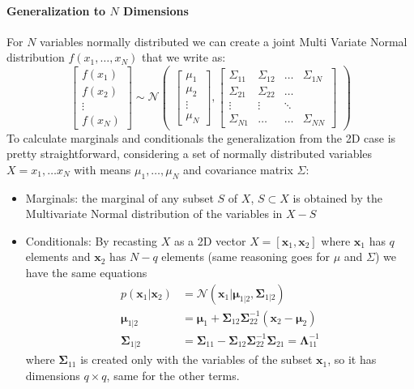 \documentclass{article}
\begin{document}
\paragraph{Generalization to $N$ Dimensions}
For $N$ variables normally distributed we can create a joint Multi Variate Normal distribution $f(x_1, \dots, x_N)$ that we write as:
\begin{equation}
    \begin{bmatrix}
    f(x_1) \\
    f(x_2) \\
    \vdots \\
    f(x_N)
    \end{bmatrix}
    \sim
    \mathcal{N}
    \begin{pmatrix}
    \begin{bmatrix}
    \mu_1 \\
    \mu_2 \\
    \vdots \\
    \mu_N
    \end{bmatrix}
    ,
    \begin{bmatrix}
    \Sigma_{11} & \Sigma_{12} & \dots & \Sigma_{1N} \\
    \Sigma_{21} & \Sigma_{22} & \dots  \\
    \vdots & \vdots{} & \ddots \\
    \Sigma_{N1} & \dots & \dots & \Sigma_{NN}
    \end{bmatrix}
    \end{pmatrix}
\end{equation}
To calculate marginals and conditionals the generalization from the 2D case is pretty straightforward, considering a set of normally distributed variables $X = {x_1, \dots x_N}$ with means $\mu_1, \dots, \mu_N$ and covariance matrix $\Sigma$:
\begin{itemize}
    \item Marginals: the marginal of any subset $S$ of $X$, $S \subset X$ is obtained by the Multivariate Normal distribution of the variables in $X - S$
    \item Conditionals: By recasting $X$ as a 2D vector $X = [\boldsymbol{x}_1, \boldsymbol{x}_2]$ where $\boldsymbol{x}_1$ has $q$ elements and $\boldsymbol{x}_2$ has $N-q$ elements (same reasoning goes for $\mu$ and $\Sigma$) we have the same equations
    \begin{align}
        p(\boldsymbol{x}_1 | \boldsymbol{x}_2) &= \mathcal{N}(\boldsymbol{x}_1 | \boldsymbol{\mu}_{1|2}, \boldsymbol{\Sigma}_{1|2}) \\
        \boldsymbol{\mu}_{1|2} &= \boldsymbol{\mu}_1 + \boldsymbol{\Sigma}_{12} \boldsymbol{\Sigma}_{22}^{-1}(\boldsymbol{x}_2 - \boldsymbol{\mu}_2) \\
        \boldsymbol{\Sigma}_{1|2} &= \boldsymbol{\Sigma}_{11} - \boldsymbol{\Sigma}_{12}\boldsymbol{\Sigma}_{22}^{-1}\boldsymbol{\Sigma}_{21} = \boldsymbol{\Lambda}^{-1}_{11}
    \end{align}
    where $\boldsymbol{\Sigma}_{11}$ is created only with the variables of the subset $\boldsymbol{x}_1$, so it has dimensions $q \times q$, same for the other terms. 
\end{itemize}
\end{document}
